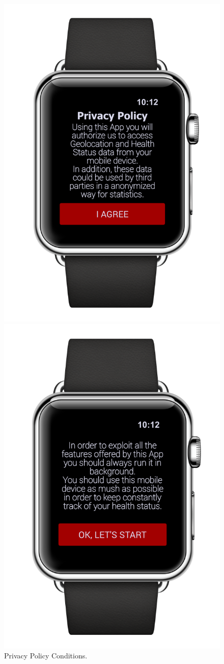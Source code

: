 \begin{enumerate}
\begin{figure}[H]
\begin{center}
\begin{minipage}[c]{.40\textwidth}
          \includegraphics[height=12 cm]{Images/Mockups/AutomatedSOSMockup2.png}
             	\caption{Privacy Policy Conditions.}
        \end{minipage}%
        \hspace{10mm}%
        \begin{minipage}[c]{.40\textwidth}
        \centering
          \includegraphics[height=12 cm]{Images/Mockups/AutomatedSOSMockup4.png}

\end{minipage}
\end{center}
\end{figure}
\end{enumerate}
